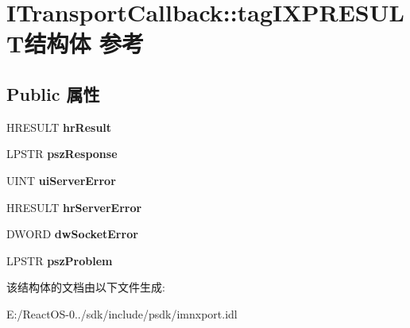\hypertarget{struct_i_transport_callback_1_1tag_i_x_p_r_e_s_u_l_t}{}\section{I\+Transport\+Callback\+:\+:tag\+I\+X\+P\+R\+E\+S\+U\+L\+T结构体 参考}
\label{struct_i_transport_callback_1_1tag_i_x_p_r_e_s_u_l_t}
\subsection*{Public 属性}
\begin{DoxyCompactItemize}
\item 
\mbox{\label{struct_i_transport_callback_1_1tag_i_x_p_r_e_s_u_l_t_affd155b50fb9e28cec782c1c8e7c58d1}} 
H\+R\+E\+S\+U\+LT {\bfseries hr\+Result}
\item 
\mbox{\label{struct_i_transport_callback_1_1tag_i_x_p_r_e_s_u_l_t_a2fd88be054528080be1c33b0d0c8a03f}} 
L\+P\+S\+TR {\bfseries psz\+Response}
\item 
\mbox{\label{struct_i_transport_callback_1_1tag_i_x_p_r_e_s_u_l_t_a7f7b35ed05fff6622838f402b7d7e4e0}} 
U\+I\+NT {\bfseries ui\+Server\+Error}
\item 
\mbox{\label{struct_i_transport_callback_1_1tag_i_x_p_r_e_s_u_l_t_abdbdf940660c9b46e2be3e622bb2a876}} 
H\+R\+E\+S\+U\+LT {\bfseries hr\+Server\+Error}
\item 
\mbox{\label{struct_i_transport_callback_1_1tag_i_x_p_r_e_s_u_l_t_a4fd4c0f3a09579864d5463d199879186}} 
D\+W\+O\+RD {\bfseries dw\+Socket\+Error}
\item 
\mbox{\label{struct_i_transport_callback_1_1tag_i_x_p_r_e_s_u_l_t_a9066171996d11653fb0c7c631c5a0ca0}} 
L\+P\+S\+TR {\bfseries psz\+Problem}
\end{DoxyCompactItemize}


该结构体的文档由以下文件生成\+:\begin{DoxyCompactItemize}
\item 
E\+:/\+React\+O\+S-\/0../sdk/include/psdk/imnxport.\+idl\end{DoxyCompactItemize}
